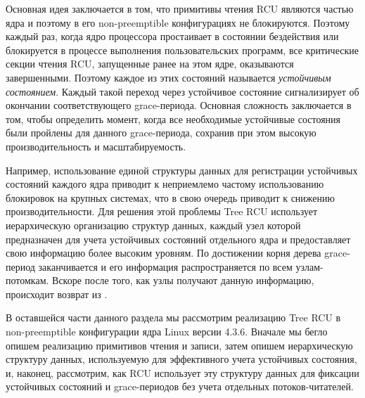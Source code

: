 %
%
Основная идея заключается в том, что примитивы чтения RCU являются
частью ядра и поэтому в его non-preemptible конфигурациях не блокируются.
Поэтому каждый раз, когда ядро процессора простаивает в состоянии бездействия
или блокируется в процессе выполнения пользовательских программ,
все критические секции чтения RCU, запущенные ранее на этом ядре,
оказываются завершенными.
Поэтому каждое из этих состояний называется \emph{устойчивым состоянием}.
Каждый такой переход через устойчивое состояние сигнализирует об
окончании соответствующего grace-периода.
Основная сложность заключается в том, чтобы определить момент,
когда все необходимые устойчивые состояния были пройлены для данного
grace-периода, сохранив при этом высокую производительность и масштабируемость.

Например, использование единой структуры данных для регистрации устойчивых
состояний каждого ядра приводит к неприемлемо частому использованию
блокировок на крупных системах, что в свою очередь приводит к снижению
производительности.
Для решения этой проблемы Tree RCU использует иерархическую организацию
структур данных, каждый узел которой предназначен для учета устойчивых
состояний отдельного ядра и предоставляет свою информацию более высоким уровням.
По достижении корня дерева grace-период заканчивается и
его информация распространяется по всем узлам-потомкам.
Вскоре после того, как узлы получают данную информацию,
происходит возврат из .

В оставшейся части данного раздела мы рассмотрим реализацию Tree RCU
в non-preemptible конфигурации ядра Linux версии 4.3.6.
Вначале мы бегло опишем реализацию примитивов чтения и записи,
затем опишем иерархическую структуру данных, используемую для эффективного
учета устойчивых состояния, и, наконец, рассмотрим, как RCU использует
эту структуру данных для фиксации устойчивых состояний и grace-периодов
без учета отдельных потоков-читателей.






